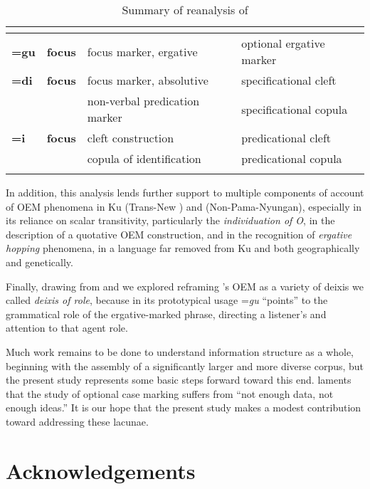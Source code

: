 \documentclass[output=paper,modfonts]{langscibook}
\begin{document}
\begin{table}
\begin{tabularx}{\textwidth}{llXX}
\lsptoprule
{} &  & {\bfseries   \citealt{JakobiCrass2004,Jakobi2006}} &  \\
\midrule 
{\bfseries =gu} & {\bfseries focus} & {{focus} marker, ergative} & {optional ergative marker}\\
{\bfseries =di} & {\bfseries focus} & {{focus} marker, absolutive} & {specificational cleft}\\
&  & {non-verbal predication marker} & {specificational copula}\\
{\bfseries =i} & {\bfseries focus} & {cleft construction} & {predicational cleft} \\
&  & {copula of identification} & {predicational copula}\\
\lspbottomrule
\end{tabularx}
\caption{Summary of reanalysis of \citealt{Jakobi2006}}
\label{tab:wolfe:2}
\end{table} 

In addition, this analysis lends further support to multiple components of  account of OEM phenomena in Ku  (Trans-New ) and  (Non-Pama-Nyungan), especially in its reliance on scalar transitivity, particularly the \textit{individuation of O}, in the description of a quotative OEM construction, and in the recognition of \textit{ergative hopping} phenomena, in a language far removed from Ku  and  both geographically and genetically. 

Finally, drawing from   \citet{Khidir2005} and \citet{Diessel2006} we explored reframing ’s OEM as a variety of deixis we called \textit{deixis of role}, because in its prototypical usage =\textit{gu} “points” to the grammatical role of the ergative-marked  phrase, directing a listener’s  and attention to that agent role.

Much work remains to be done to understand  information structure as a whole, beginning with the assembly of a significantly larger and more diverse corpus, but the present study represents some basic steps forward toward this end. \citet[1626]{McGregor2009} laments that the study of optional case marking suffers from “not enough data, not enough ideas.” It is our hope that the present study makes a modest contribution toward addressing these lacunae.

\section*{Acknowledgements}
\end{document}
